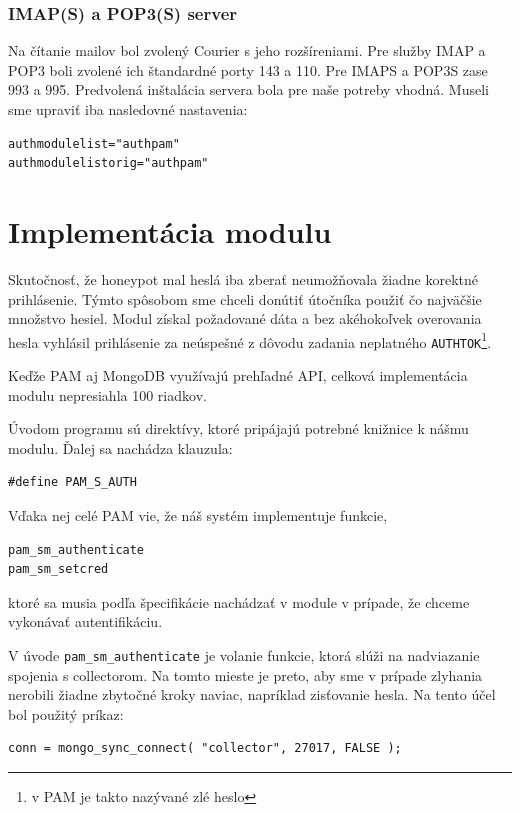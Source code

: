 \documentclass[12pt, oneside]{book}
\begin{document}
\subsubsection{IMAP(S) a POP3(S) server}
Na čítanie mailov bol zvolený Courier s jeho rozšíreniami.
Pre služby IMAP a POP3 boli zvolené ich štandardné porty 143 a 110. Pre IMAPS a POP3S zase 993 a 995.
Predvolená inštalácia servera bola pre naše potreby vhodná. Museli sme upraviť iba nasledovné nastavenia:

\begin{lstlisting}[style=customBash]
authmodulelist="authpam"
authmodulelistorig="authpam"
\end{lstlisting}

\section{Implementácia modulu}

Skutočnosť, že honeypot mal heslá iba zberať neumožňovala žiadne korektné prihlásenie.
Týmto spôsobom sme chceli donútiť útočníka použiť čo najväčšie množstvo hesiel.
Modul získal požadované dáta a bez akéhokoľvek overovania hesla vyhlásil prihlásenie za neúspešné z dôvodu zadania neplatného  \texttt{AUTHTOK}\footnote{v PAM je takto nazývané zlé heslo}.

Keďže PAM aj MongoDB využívajú prehľadné API, celková im\-ple\-men\-tá\-cia modulu nepresiahla 100 riadkov.

Úvodom programu sú direktívy, ktoré pripájajú potrebné knižnice k nášmu modulu.
Ďalej sa nachádza klauzula:
\begin{lstlisting}[style=customC]
#define PAM_S_AUTH
\end{lstlisting}

Vďaka nej celé PAM vie, že náš systém implementuje funkcie,
\begin{lstlisting}[style=customC]
pam_sm_authenticate
pam_sm_setcred
\end{lstlisting}
ktoré sa musia podľa špecifikácie nachádzať v module v prípade, že chceme vykonávať autentifikáciu.

V úvode \texttt{pam\_sm\_authenticate} je volanie funkcie, ktorá slúži na nadviazanie spojenia s collectorom.
Na tomto mieste je preto, aby sme v prípade zlyhania nerobili žiadne zbytočné kroky naviac, napríklad zisťovanie hesla.
Na tento účel bol použitý príkaz:
\begin{lstlisting}[style=customC]
conn = mongo_sync_connect( "collector", 27017, FALSE );
\end{lstlisting}
\end{document}
